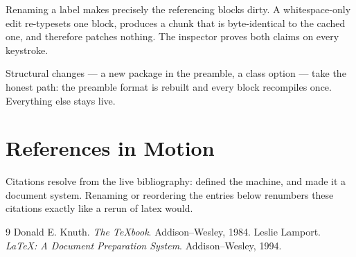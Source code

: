 \documentclass{article}
\begin{document}
Renaming a label makes precisely the referencing blocks dirty. A
whitespace-only edit re-typesets one block, produces a chunk that is
byte-identical to the cached one, and therefore patches nothing. The
inspector proves both claims on every keystroke.

Structural changes --- a new package in the preamble, a class option
--- take the honest path: the preamble format is rebuilt and every
block recompiles once. Everything else stays live.

\section{References in Motion}
\label{sec:refs}

Citations resolve from the live bibliography: \cite{knuth84} defined
the machine, and \cite{lamport94} made it a document system. Renaming
or reordering the entries below renumbers these citations exactly like
a rerun of latex would.

\begin{thebibliography}{9}
 Donald E. Knuth. \emph{The \TeX book}.
Addison--Wesley, 1984.
 Leslie Lamport. \emph{\LaTeX: A Document
Preparation System}. Addison--Wesley, 1994.
\end{thebibliography}
\end{document}
